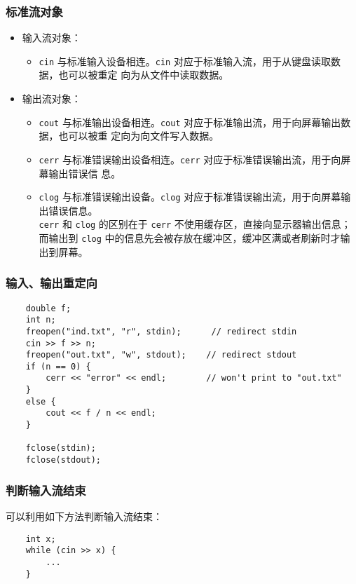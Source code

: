 \documentclass[UTF8]{ctexart}
\begin{document}
\subsubsection{标准流对象}
\begin{itemize}
    \item 输入流对象：
    \begin{itemize}
        \item \texttt{cin} 与标准输入设备相连。\texttt{cin} 对应于标准输入流，用于从键盘读取数据，也可以被重定
        向为从文件中读取数据。
    \end{itemize}
    \item 输出流对象：
    \begin{itemize}
        \item \texttt{cout} 与标准输出设备相连。\texttt{cout} 对应于标准输出流，用于向屏幕输出数据，也可以被重
        定向为向文件写入数据。
        \item \texttt{cerr} 与标准错误输出设备相连。\texttt{cerr} 对应于标准错误输出流，用于向屏幕输出错误信
        息。
        \item \texttt{clog} 与标准错误输出设备。\texttt{clog} 对应于标准错误输出流，用于向屏幕输出错误信息。\\
        \texttt{cerr} 和 \texttt{clog} 的区别在于 \texttt{cerr} 不使用缓存区，直接向显示器输出信息；而输出到
        \texttt{clog} 中的信息先会被存放在缓冲区，缓冲区满或者刷新时才输出到屏幕。
    \end{itemize}
\end{itemize}

\subsubsection{输入、输出重定向}
\begin{verbatim}
    double f;
    int n;
    freopen("ind.txt", "r", stdin);      // redirect stdin
    cin >> f >> n;
    freopen("out.txt", "w", stdout);    // redirect stdout
    if (n == 0) {
        cerr << "error" << endl;        // won't print to "out.txt"
    }
    else {
        cout << f / n << endl;
    }

    fclose(stdin);
    fclose(stdout);
\end{verbatim}

\subsubsection{判断输入流结束}
可以利用如下方法判断输入流结束：
\begin{verbatim}
    int x;
    while (cin >> x) {
        ...
    }
\end{verbatim}
\end{document}

